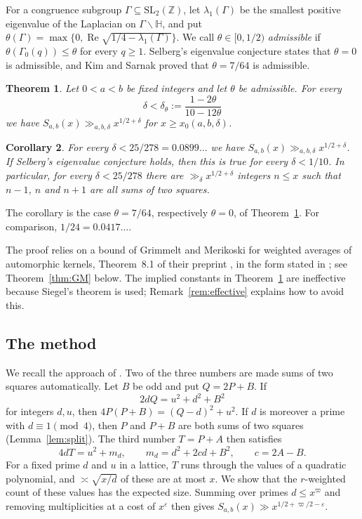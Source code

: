 \documentclass[11pt]{amsart}
\newtheorem{theorem}{Theorem}[section]
\newtheorem{corollary}[theorem]{Corollary}
\theoremstyle{remark}
\theoremstyle{definition}
\numberwithin{equation}{section}
\newcommand{\Z}{\mathbb{Z}}
\newcommand{\Hb}{\mathbb{H}}
\newcommand{\eps}{\varepsilon}
\newcommand{\SL}{\mathrm{SL}}
\begin{document}
For a congruence subgroup $\Gamma\subseteq\SL_2(\Z)$, let $\lambda_1(\Gamma)$ be the smallest positive eigenvalue of the Laplacian on $\Gamma\backslash\Hb$, and put $\theta(\Gamma)=\max\{0,\operatorname{Re}\sqrt{1/4-\lambda_1(\Gamma)}\}$. We call $\theta\in[0,1/2)$ \emph{admissible} if $\theta(\Gamma_0(q))\le\theta$ for every $q\ge1$. Selberg's eigenvalue conjecture states that $\theta=0$ is admissible, and Kim and Sarnak \cite[Appendix~2]{Kim} proved that $\theta=7/64$ is admissible.

\begin{theorem}\label{thm:main}
Let $0<a<b$ be fixed integers and let $\theta$ be admissible. For every
\[
\delta<\delta_\theta:=\frac{1-2\theta}{10-12\theta}
\]
we have $S_{a,b}(x)\gg_{a,b,\delta}x^{1/2+\delta}$ for $x\ge x_0(a,b,\delta)$.
\end{theorem}

\begin{corollary}\label{cor:main}
For every $\delta<25/278=0.0899\ldots$ we have $S_{a,b}(x)\gg_{a,b,\delta}x^{1/2+\delta}$. If Selberg's eigenvalue conjecture holds, then this is true for every $\delta<1/10$. In particular, for every $\delta<25/278$ there are $\gg_\delta x^{1/2+\delta}$ integers $n\le x$ such that $n-1$, $n$ and $n+1$ are all sums of two squares.
\end{corollary}

The corollary is the case $\theta=7/64$, respectively $\theta=0$, of Theorem~\ref{thm:main}. For comparison, $1/24=0.0417\ldots$.

The proof relies on a bound of Grimmelt and Merikoski for weighted averages of automorphic kernels, Theorem~8.1 of their preprint \cite{GM1}, in the form stated in \cite[Theorem~2.1]{GM}; see Theorem~\ref{thm:GM} below. The implied constants in Theorem~\ref{thm:main} are ineffective because Siegel's theorem is used; Remark~\ref{rem:effective} explains how to avoid this.

\subsection{The method}\label{sec:method}
We recall the approach of \cite{I}. Two of the three numbers are made sums of two squares automatically. Let $B$ be odd and put $Q=2P+B$. If
\[
2dQ=u^2+d^2+B^2
\]
for integers $d,u$, then $4P(P+B)=(Q-d)^2+u^2$. If $d$ is moreover a prime with $d\equiv1\pmod 4$, then $P$ and $P+B$ are both sums of two squares (Lemma~\ref{lem:split}). The third number $T=P+A$ then satisfies
\[
4dT=u^2+m_d,\qquad m_d=d^2+2cd+B^2,\qquad c=2A-B.
\]
For a fixed prime $d$ and $u$ in a lattice, $T$ runs through the values of a quadratic polynomial, and $\asymp\sqrt{x/d}$ of these are at most $x$. We show that the $r$-weighted count of these values has the expected size. Summing over primes $d\le x^{\varpi}$ and removing multiplicities at a cost of $x^{\eps}$ then gives $S_{a,b}(x)\gg x^{1/2+\varpi/2-\eps}$.
\end{document}
